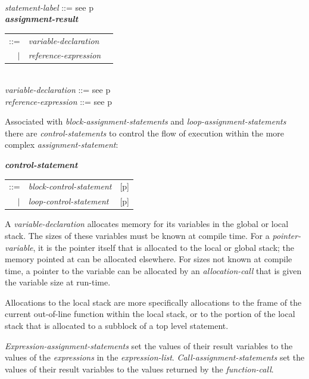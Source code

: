 \documentclass[12pt]{article}
\newcommand{\emkey}[1]{{\em \bfseries #1}}
\newcommand{\pagref}[1]{p\pageref{#1}}
\newenvironment{indpar}[1][0.3in]%
	{\begin{list}{}%
		     {\setlength{\itemsep}{0in}%
		      \setlength{\topsep}{0in}%
		      \setlength{\parsep}{1ex}%
		      \setlength{\labelwidth}{#1}%
		      \setlength{\leftmargin}{#1}%
		      \addtolength{\leftmargin}{\labelsep}}%
	 \item}%
	{\end{list}}
\begin{document}
\begin{indpar}
\\[0.5ex]
{\em statement-label} ::= see \pagref{STATEMENT-LABEL}
\\[0.5ex]
\emkey{assignment-result}\label{ASSIGNMENT-RESULT}
    \begin{tabular}[t]{@{}rll}
    ::= & {\em variable-declaration} \\
    $|$ & {\em reference-expression}
    \end{tabular}
\\[0.5ex]
{\em variable-declaration} ::= see \pagref{VARIABLE-DECLARATION}
\\[0.5ex]
{\em reference-expression} ::= see \pagref{REFERENCE-EXPRESSIONS}

\end{indpar}

Associated with {\em block-assignment-statements} and
{\em loop-assignment-statements}
there are {\em con\-trol-statements}
to control the flow of execution within the more complex
{\em assignment-state\-ment}:
\begin{indpar}
\emkey{control-statement}\label{CONTROL-STATEMENT}
    \begin{tabular}[t]{@{}rll}
    ::= & {\em block-control-statement}
        & [\pagref{BLOCK-CONTROL-STATEMENT}] \\
    $|$ & {\em loop-control-statement}
        & [\pagref{LOOP-CONTROL-STATEMENT}] \\
    \end{tabular}
\end{indpar}

A {\em variable-declaration}\label{VARIABLE-ALLOCATION}
allocates memory for its variables in the global or local stack.
The sizes of these variables must be known at compile time.
For a {\em pointer-variable}, it is the pointer itself that is
allocated to the local or global stack; the
memory pointed at can be allocated elsewhere.
For sizes not known at compile time, a pointer to the variable
can be allocated by an {\em allocation-call} that is given the variable
size at run-time.

Allocations to the local stack are more specifically allocations to the
frame of the current out-of-line function within the local stack,
or to the portion of the local stack that is allocated to
a subblock of a top level statement.

{\em Expression-assignment-statements} set the values of their result variables
to the values of the {\em expressions} in the {\em expression-list}.
{\em Call-assignment-statements} set the values of their result variables
to the values returned by the {\em function-call}.
\end{document}
